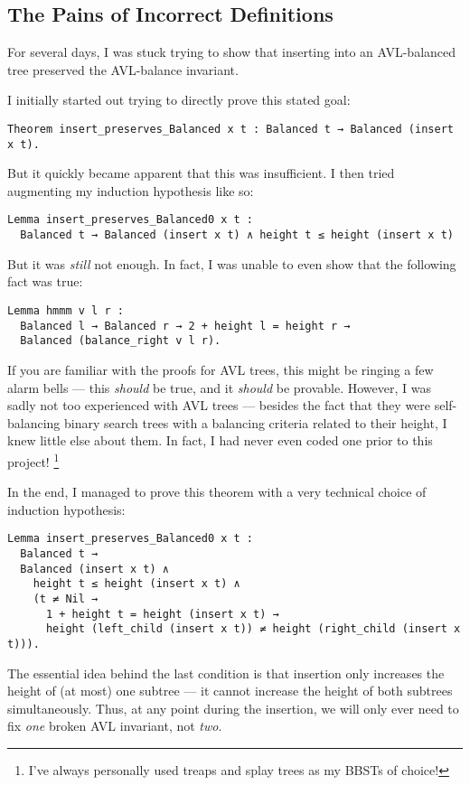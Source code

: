 \documentclass[acmsmall, authorversion, nonacm, overload]{acmart}
\begin{document}
\subsection{The Pains of Incorrect Definitions}
For several days, I was stuck trying to show that
inserting into an AVL-balanced tree preserved
the AVL-balance invariant.

I initially started out trying to directly prove this stated goal:
\begin{verbatim}
Theorem insert_preserves_Balanced x t : Balanced t → Balanced (insert x t).
\end{verbatim}
But it quickly became apparent that this was insufficient.
I then tried augmenting my induction hypothesis like so:
\begin{verbatim}
Lemma insert_preserves_Balanced0 x t :
  Balanced t → Balanced (insert x t) ∧ height t ≤ height (insert x t)
\end{verbatim}
But it was \emph{still} not enough.
In fact, I was unable to even show that the following fact was true:
\begin{verbatim}
Lemma hmmm v l r :
  Balanced l → Balanced r → 2 + height l = height r →
  Balanced (balance_right v l r).
\end{verbatim}
If you are familiar with the proofs for AVL trees,
this might be ringing a few alarm bells --- this \emph{should} be true, and it \emph{should} be provable.
However, I was sadly not too experienced with AVL trees --- besides the fact that they were self-balancing
binary search trees with a balancing criteria related to their height,
I knew little else about them.
In fact, I had never even coded one prior to this project!
\footnote{I've always personally used treaps and splay trees as my BBSTs of choice!}

\vspace{1em}
\noindent In the end, I managed to prove this theorem with a very technical choice of induction hypothesis:
\begin{verbatim}
Lemma insert_preserves_Balanced0 x t :
  Balanced t →
  Balanced (insert x t) ∧
    height t ≤ height (insert x t) ∧
    (t ≠ Nil →
      1 + height t = height (insert x t) →
      height (left_child (insert x t)) ≠ height (right_child (insert x t))).
\end{verbatim}
The essential idea behind the last condition is that
insertion only increases the height of (at most) one subtree ---
it cannot increase the height of both subtrees simultaneously.
Thus, at any point during the insertion, we will only ever need to
fix \emph{one} broken AVL invariant, not \emph{two}.
\end{document}
